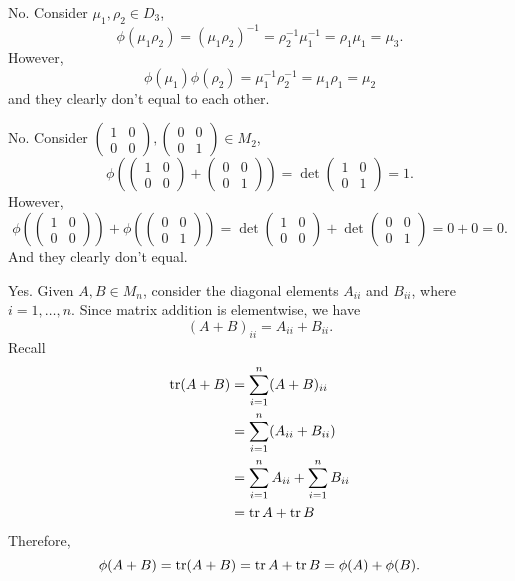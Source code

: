 \documentclass[12pt]{article}
\begin{document}
\begin{problem}[13.8]
No. Consider $ \mu_1, \rho_2 \in D_3$,
\[
	\phi(\mu_1 \rho_2) = (\mu_1 \rho_2)^{-1} = \rho_2 ^{-1} \mu_1 ^{-1} = \rho_1 \mu_1 = \mu_3 
.\] 
However,
\[
	\phi(\mu_1) \phi(\rho_2) = \mu_1 ^{-1} \rho_2 ^{-1} = \mu_1 \rho_1 = \mu_2 
\] 
and they clearly don't equal to each other.
\end{problem}
\begin{problem}[13.12]
	No. Consider $ \begin{pmatrix} 1&0\\0&0 \end{pmatrix}, \begin{pmatrix} 0&0\\0&1 \end{pmatrix} \in M_2 $,
	\[
		\phi\left(  \begin{pmatrix} 1&0\\0&0 \end{pmatrix} + \begin{pmatrix} 0&0\\0&1 \end{pmatrix}  \right) = \det \begin{pmatrix}  1&0\\0&1  \end{pmatrix} = 1
	.\] 
	However,
	\[
		\phi \left(\begin{pmatrix} 1&0\\0&0 \end{pmatrix}\right) + \phi \left(\begin{pmatrix} 0&0\\0&1 \end{pmatrix} \right) = \det \begin{pmatrix} 1&0\\0&0 \end{pmatrix} + \det \begin{pmatrix} 0&0\\0&1 \end{pmatrix} = 0+0=0
	.\] 
	And they clearly don't equal.
\end{problem}
\begin{problem}[13.13]
Yes. Given $ A,B \in M_n$, consider the diagonal elements $ A_{ii} $ and $ B_{ii} $, where $ i=1,\ldots,n$. Since matrix addition is elementwise, we have
\[
	(A+B)_{ii}=A_{ii} + B_{ii} 
.\] 
Recall 
\begin{align*}
	\operatorname{tr}(A+B) &= \sum_{ i= 1}^{ n} (A+B)_{ii}\\
		 &= \sum_{ i= 1}^{ n} (A_{ii} + B_{ii} )\\
		 &= \sum_{ i= 1}^{ n} A_{ii} + \sum_{ i= 1}^{ n} B_{ii} \\
		 &= \operatorname{tr} A + \operatorname{tr} B \\
\end{align*}
Therefore,
\[
	\phi(A+B)=\operatorname{tr} (A+B) = \operatorname{tr} A + \operatorname{tr} B = \phi(A) + \phi(B)   
.\] 
\end{problem}
\end{document}

